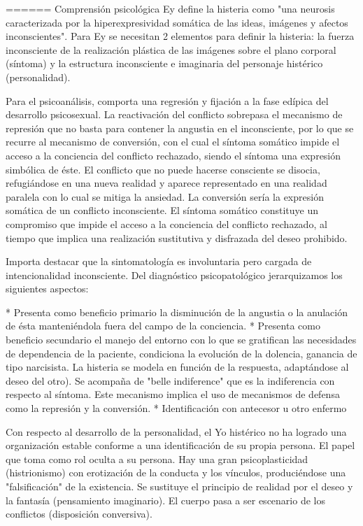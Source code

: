 ====== Comprensión psicológica
Ey define la histeria como "una neurosis caracterizada por la hiperexpresividad somática de las ideas, imágenes y afectos inconscientes". Para Ey se necesitan 2 elementos para definir la histeria: la fuerza inconsciente de la realización plástica de las imágenes sobre el plano corporal (síntoma) y la estructura inconsciente e imaginaria del personaje histérico (personalidad).

Para el psicoanálisis, comporta una regresión y fijación a la fase edípica del desarrollo psicosexual. La reactivación del conflicto sobrepasa el mecanismo de represión que no basta para contener la angustia en el inconsciente, por lo que se recurre al mecanismo de conversión, con el cual el síntoma somático impide el acceso a la conciencia del conflicto rechazado, siendo el síntoma una expresión simbólica de éste. El conflicto que no puede hacerse consciente se disocia, refugiándose en una nueva realidad y aparece representado en una realidad paralela con lo cual se mitiga la ansiedad. La conversión sería la expresión somática de un conflicto inconsciente. El síntoma somático constituye un compromiso que impide el acceso a la conciencia del conflicto rechazado, al tiempo que implica una realización sustitutiva y disfrazada del deseo prohibido.

Importa destacar que la sintomatología es involuntaria pero cargada de intencionalidad inconsciente. Del diagnóstico psicopatológico jerarquizamos los siguientes aspectos:

* Presenta como beneficio primario la disminución de la angustia o la anulación de ésta manteniéndola fuera del campo de la conciencia.
* Presenta como beneficio secundario el manejo del entorno con lo que se gratifican las necesidades de dependencia de la paciente, condiciona la evolución de la dolencia, ganancia de tipo narcisista. La histeria se modela en función de la respuesta, adaptándose al deseo del otro). Se acompaña de "belle indiference" que es la indiferencia con respecto al síntoma. Este mecanismo implica el uso de mecanismos de defensa como la represión y la conversión.
* Identificación con antecesor u otro enfermo

Con respecto al desarrollo de la personalidad, el Yo histérico no ha logrado una organización estable conforme a una identificación de su propia persona. El papel que toma como rol oculta a su persona. Hay una gran psicoplasticidad (histrionismo) con erotización de la conducta y los vínculos, produciéndose una "falsificación" de la existencia. Se sustituye el principio de realidad por el deseo y la fantasía (pensamiento imaginario). El cuerpo pasa a ser escenario de los conflictos (disposición conversiva).

